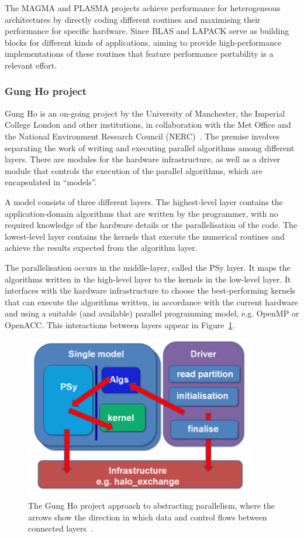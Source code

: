 The MAGMA and PLASMA projects achieve performance for heterogeneous architectures by directly coding different routines and maximising their performance for specific hardware. Since BLAS and LAPACK serve as building blocks for different kinds of applications, aiming to provide high-performance implementations of these routines that feature performance portability is a relevant effort.

\subsubsection{Gung Ho project}

Gung Ho is an on-going project by the University of Manchester, the Imperial College London and other institutions, in collaboration with the Met Office and the National Environment Research Council (NERC)~\cite{ford2013}. The premise involves separating the work of writing and executing parallel algorithms among different layers. There are modules for the hardware infrastructure, as well as a driver module that controls the execution of the parallel algorithms, which are encapsulated in ``models''.

A model consists of three different layers. The highest-level layer contains the application-domain algorithms that are written by the programmer, with no required knowledge of the hardware details or the parallelisation of the code. The lowest-level layer contains the kernels that execute the numerical routines and achieve the results expected from the algorithm layer.

The parallelisation occurs in the middle-layer, called the PSy layer. It maps the algorithms written in the high-level layer to the kernels in the low-level layer. It interfaces with the hardware infrastructure to choose the best-performing kernels that can execute the algorithms written, in accordance with the current hardware and using a suitable (and available) parallel programming model, e.g. OpenMP or OpenACC. This interactions between layers appear in Figure~\ref{f:gung}.

\begin{figure}[!h]
\begin{center}
\centerline{\includegraphics[width=4in]{img/gung}}
\caption[The Gung Ho project approach to abstracting parallelism.]{The Gung Ho project approach to abstracting parallelism, where the arrows show the direction in which data and control flows between connected layers~\cite{ford2013}.}
\label{f:gung}
\end{center}
\end{figure}

